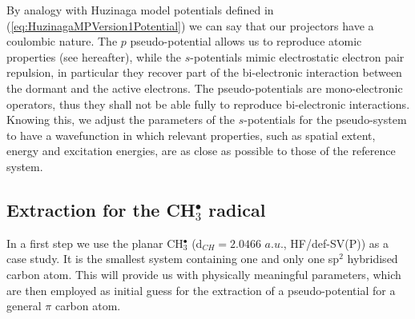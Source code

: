 \documentclass[aip]{revtex4-1}
\begin{document}
By analogy with Huzinaga model potentials defined in (\ref{eq:HuzinagaMPVersion1Potential})
we can say that our projectors have a coulombic nature.
The \(p\) pseudo-potential allows us to reproduce atomic properties (see hereafter), while the
\(s\)-potentials mimic electrostatic electron pair repulsion, in particular they 
recover part of the bi-electronic interaction
between the dormant and the active electrons. The pseudo-potentials are mono-electronic operators, thus they shall not be able fully to reproduce bi-electronic interactions. Knowing this, we adjust the parameters of the \(s\)-potentials for the pseudo-system to have a wavefunction in which relevant properties, such as spatial extent, energy and excitation energies, are as close as possible to those of the reference system.

\subsection{Extraction for the CH$_3^\bullet$ radical}
\label{section:potential_derivation}

In a first step we use the planar CH\(^{\bullet}_{3}\) (d$_{CH}=2.0466$ $a.u.$, HF/def-SV(P)) as 
a case study.
It is the smallest system containing one and only one sp$^2$ hybridised carbon atom.
This will provide us with physically meaningful parameters, which are then employed as
initial guess for the extraction of a pseudo-potential for a general $\pi$ carbon atom.
\end{document}
